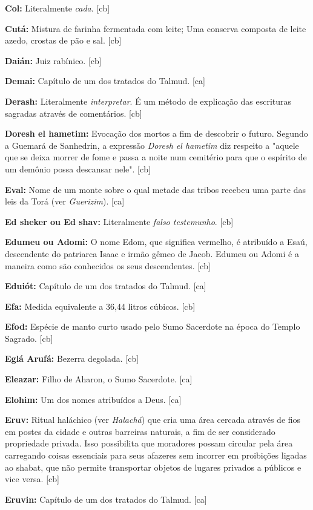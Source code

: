 \textbf{Col:} Literalmente \emph{cada}. [cb]

\textbf{Cutá:} Mistura de farinha fermentada com leite; Uma conserva composta de leite azedo, crostas de pão e sal. [cb]

\textbf{Daián:} Juiz rabínico. [cb]

\textbf{Demai:} Capítulo de um dos tratados do Talmud. [ca]

\textbf{Derash:} Literalmente \emph{interpretar}. É um método de explicação 
das escrituras sagradas através de comentários. [cb]

\textbf{Doresh el hametim:} Evocação dos mortos a fim de descobrir o futuro. 
Segundo a Guemará de Sanhedrin, a expressão \emph{Doresh el hametim} diz respeito 
a "aquele que se deixa morrer de fome e passa a noite num cemitério para
que o espírito de um demônio possa descansar nele". [cb]

\textbf{Eval:} Nome de um monte sobre o qual metade das tribos recebeu uma parte 
das leis da Torá (ver \emph{Guerizim}). [ca]

\textbf{Ed sheker ou Ed shav:} Literalmente \emph{falso testemunho}. [cb]

\textbf{Edumeu ou Adomi:} O nome Edom, que significa vermelho, é atribuído a 
Esaú, descendente do patriarca Isaac e irmão gêmeo de Jacob. Edumeu ou Adomi 
é a maneira como são conhecidos os seus descendentes. [cb]

\textbf{Eduiót:} Capítulo de um dos tratados do Talmud. [ca]

\textbf{Efa:} Medida equivalente a 36,44 litros cúbicos. [cb]

\textbf{Efod:} Espécie de manto curto usado pelo Sumo Sacerdote na
época do Templo Sagrado. [cb]

\textbf{Eglá Arufá:} Bezerra degolada. [cb]

\textbf{Eleazar:} Filho de Aharon, o Sumo Sacerdote. [ca]

\textbf{Elohim:} Um dos nomes atribuídos a Deus. [ca]

\textbf{Eruv:} Ritual haláchico (ver \emph{Halachá}) que cria uma área cercada 
através de fios em postes da cidade e outras barreiras naturais, a fim de ser 
considerado propriedade privada. Isso possibilita que moradores possam circular 
pela área carregando coisas essenciais para seus afazeres sem incorrer em 
proibições ligadas ao shabat, que não permite transportar objetos de lugares 
privados a públicos e vice versa. [cb]

\textbf{Eruvin:} Capítulo de um dos tratados do Talmud. [ca]

